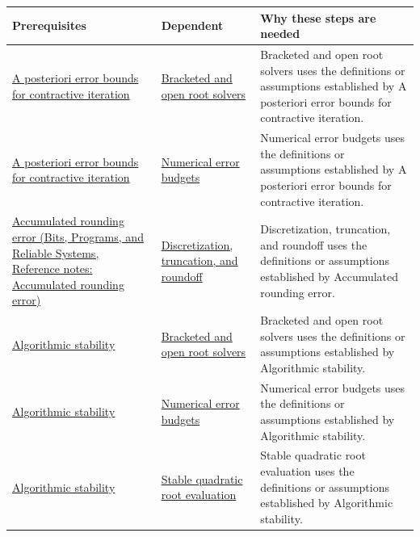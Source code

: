 {\def\LTcaptype{none} %
\begin{longtable}[]{@{}
  >{\raggedright\arraybackslash}p{}
  >{\raggedright\arraybackslash}p{}
  >{\raggedright\arraybackslash}p{}@{}}
\toprule\noalign{}
\begin{minipage}[b]{\linewidth}\raggedright
Prerequisites
\end{minipage} & \begin{minipage}[b]{\linewidth}\raggedright
Dependent
\end{minipage} & \begin{minipage}[b]{\linewidth}\raggedright
Why these steps are needed
\end{minipage} \\
\midrule\noalign{}
\endhead
\bottomrule\noalign{}
\endlastfoot
\hyperref[appendix-d83b0ad1be7f]{A posteriori error bounds for contractive iteration} & \hyperref[appendix-f63eb850796d]{Bracketed and open root solvers} & Bracketed and open root solvers uses the definitions or assumptions established by A posteriori error bounds for contractive iteration. \\
\hyperref[appendix-d83b0ad1be7f]{A posteriori error bounds for contractive iteration} & \hyperref[appendix-31b8c295e05f]{Numerical error budgets} & Numerical error budgets uses the definitions or assumptions established by A posteriori error bounds for contractive iteration. \\
\href{../01-Bits-Programs-and-Reliable-Systems/main.pdf\#nameddest=appendix-f82e270791c8}{Accumulated rounding error (Bits, Programs, and Reliable Systems, Reference notes: Accumulated rounding error)} & \hyperref[appendix-6b0648b2b8e8]{Discretization, truncation, and roundoff} & Discretization, truncation, and roundoff uses the definitions or assumptions established by Accumulated rounding error. \\
\hyperref[appendix-aa2bf0d79639]{Algorithmic stability} & \hyperref[appendix-f63eb850796d]{Bracketed and open root solvers} & Bracketed and open root solvers uses the definitions or assumptions established by Algorithmic stability. \\
\hyperref[appendix-aa2bf0d79639]{Algorithmic stability} & \hyperref[appendix-31b8c295e05f]{Numerical error budgets} & Numerical error budgets uses the definitions or assumptions established by Algorithmic stability. \\
\hyperref[appendix-aa2bf0d79639]{Algorithmic stability} & \hyperref[appendix-b9afba7f63e5]{Stable quadratic root evaluation} & Stable quadratic root evaluation uses the definitions or assumptions established by Algorithmic stability. \\

\end{longtable}}
